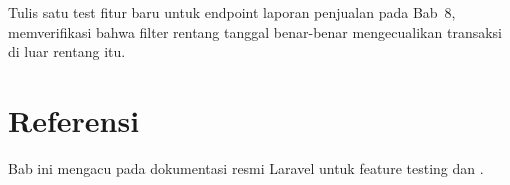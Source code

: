 \begin{challengebox}
Tulis satu test fitur baru untuk endpoint laporan penjualan pada
Bab~8, memverifikasi bahwa filter rentang tanggal benar-benar
mengecualikan transaksi di luar rentang itu.
\end{challengebox}

\section{Referensi}

Bab ini mengacu pada dokumentasi resmi Laravel \cite{laraveldocs} untuk
feature testing dan .
